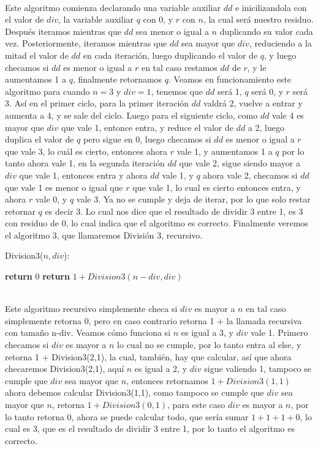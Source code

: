 \documentclass[12pt,twoside]{article}
\begin{document}
\\ Este algoritmo comienza declarando una variable auxiliar $dd$ e inicilizandola con el valor de $div$, la variable auxiliar $q$ con 0, y $r$ con $n$, la cual será nuestro residuo. Después iteramos mientras que $dd$ sea menor o igual a $n$ duplicando su valor cada vez. Posteriormente, iteramos mientras que $dd$ sea mayor que $div$, reduciendo a la mitad el valor de $dd$ en cada iteración, luego duplicando el valor de $q$, y luego checamos si $dd$ es menor o igual a $r$ en tal caso restamos $dd$ de $r$, y le aumentamos 1 a $q$, finalmente retornamos $q$. Veamos en funcionamiento este algoritmo para cuando $n=3$ y $div=1$, tenemos que $dd$ será 1, $q$ será 0, y $r$ será 3. Así en el primer ciclo, para la primer iteración $dd$ valdrá 2, vuelve a entrar y aumenta a 4, y se sale del ciclo. Luego para el siguiente ciclo, como $dd$ vale 4 es mayor que $div$ que vale 1, entonce entra, y reduce el valor de $dd$ a 2, luego duplica el valor de $q$ pero sigue en 0, luego checamos si $dd$ es menor o igual a $r$ que vale 3, lo cuál es cierto, entonces ahora $r$ vale 1, y aumentamos 1 a $q$ por lo tanto ahora vale 1, en la segunda iteración $dd$ que vale 2, sigue siendo mayor a $div$ que vale 1, entonces entra y ahora $dd$ vale 1, y $q$ ahora vale 2, checamos si $dd$ que vale 1 es menor o igual que $r$ que vale 1, lo cual es cierto entonces entra, y ahora $r$ vale 0, y $q$ vale 3. Ya no se cumple y deja de iterar, por lo que solo restar retornar $q$ es decir 3. Lo cual nos dice que el resultado de dividir 3 entre 1, es 3 con residuo de 0, lo cual indica que el algoritmo es correcto.
\newpage
Finalmente veremos el algoritmo 3, que llamaremos División 3, recursivo.
\begin{algorithm}
    \caption{Division3($n,div$):}
    \begin{algorithmic}
            \State \textbf{return} $0$
        \Else
            \State \textbf{return} $1+Division3(n-div,div)$
        \EndIf
    \end{algorithmic}
\end{algorithm}
\\ Este algoritmo recursivo simplemente checa si $div$ es mayor a $n$ en tal caso simplemente retorna 0, pero en caso contrario retorna 1 + la llamada recursiva con tamaño n-div. Veamos cómo funciona si $n$ es igual a 3, y $div$ vale 1. Primero checamos si $div$ es mayor a $n$ lo cual no se cumple, por lo tanto entra al else, y retorna 1 + Division3(2,1), la cual, también, hay que calcular, así que ahora checaremos Division3(2,1), aquí $n$ es igual a 2, y $div$ sigue valiendo 1, tampoco se cumple que $div$ sea mayor que $n$, entonces retornamos $1+Division3(1,1)$ ahora debemos calcular Division3(1,1), como tampoco se cumple que $div$ sea mayor que $n$, retorna $1+Division3(0,1)$, para este caso $div$ es mayor a $n$, por lo tanto retorna 0, ahora se puede calcular todo, que sería sumar $1+1+1+0$, lo cual es 3, que es el resultado de dividir 3 entre 1, por lo tanto el algoritmo es correcto. 
\end{document}
